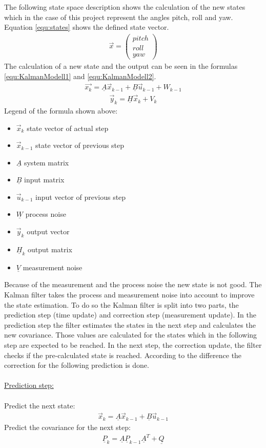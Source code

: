 The following state space description shows the calculation of the new states which in the case of this project represent the angles pitch, roll and yaw. Equation \ref{equ:states} shows the defined state vector.
\begin{align}
\vec x = \begin{pmatrix} pitch \\ roll \\ yaw \end{pmatrix}
\label{equ:states}
\end{align}
The calculation of a new state and the output can be seen in the formulas \ref{equ:KalmanModell1} and \ref{equ:KalmanModell2}.
\begin{align}
\vec{x_k} = \underline{A}\vec x_{k-1}+\underline{B}\vec u_{k-1} + W_{k-1}
\label{equ:KalmanModell1}
\end{align}
\begin{align}
\vec y_k = \underline{H}\vec x_k+ V_k
\label{equ:KalmanModell2}
\end{align}
Legend of the formula shown above:\\
\begin{itemize}
	\item $\vec{x}_k$ state vector of actual step
	\item $\vec{x}_{k-1}$ state vector of previous step
	\item $\underline{A}$ system matrix
	\item $\underline{B}$ input matrix
	\item $\vec{u}_{k-1}$ input vector of previous step
	\item $\underline{W}$ process noise
	\item $\vec{y}_{k}$ output vector
	\item $\underline{H}_k$ output matrix
	\item $\underline{V}$ measurement noise
\end{itemize}
Because of the measurement and the process noise the new state is not good. The Kalman filter takes the process and measurement noise into account to improve the state estimation. To do so the Kalman filter is split into two parts, the prediction step (time update) and correction step (measurement update). In the prediction step the filter estimates the states in the next step and calculates the new covariance. Those values are calculated for the states which in the following step are expected to be reached. In the next step, the correction update, the filter checks if the pre-calculated state is reached. According to the difference the correction for the following prediction is done.\\\\
\underline{Prediction step:}\\\\
Predict the next state:
\begin{align}
\vec x_k = \underline{A}\vec x_{k-1}+\underline{B}\vec u_{k-1}
\label{equ:Kalman1}
\end{align}
Predict the covariance for the next step:
\begin{align}
\underline{P}_k = \underline{A}\underline{P}_{k-1}\underline{A}^T+\underline{Q}
\label{equ:Kalman2}
\end{align}

